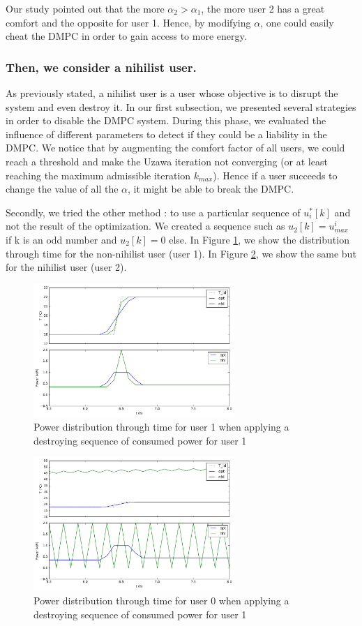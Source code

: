 \documentclass[conference]{IEEEtran}
\begin{document}
Our study pointed out that the more $\alpha_2 > \alpha_1$, the more user 2 has a great comfort and the opposite for user 1. Hence, by modifying $\alpha$, one could easily cheat the DMPC in order to gain access to more energy.


\subsubsection{Then, we consider a nihilist user.}
As previously stated, a nihilist user is a user whose objective is to disrupt the system and even destroy it. In our first subsection, we presented several strategies in order to disable the DMPC system.  During this phase, we evaluated the influence of different parameters to detect if they could be a liability in the DMPC. We notice that by augmenting the comfort factor of all users, we could reach a threshold and make the Uzawa iteration not converging (or at least reaching the maximum admissible iteration $k_{max}$). Hence if a user succeeds to change the value of all the $\alpha$, it might be able to break the DMPC. 

Secondly, we tried the other method : to use a particular sequence of $u^*_i[k]$ and not the result of the optimization. We created a sequence such as $u_2[k] = u^i_{max}$ if k is an odd number and  $u_2[k]=0$ else.  In Figure \ref{Nihil_1}, we show the distribution through time for the non-nihilist user (user 1). In Figure \ref{Nihil_2}, we show the same but for the nihilist user (user 2).
\begin{figure}[H]
\centering
\includegraphics[width=3in]{NihilSeq_init.pdf}
\caption{Power distribution through time for user 1 when applying a destroying sequence of consumed power for user 1}
\label{Nihil_1}
\end{figure}

\begin{figure}[H]
\centering
\includegraphics[width=3in]{NihilSeq.pdf}
\caption{Power distribution through time for user 0 when applying a destroying sequence of consumed power for user 1}
\label{Nihil_2}
\end{figure}
\end{document}
